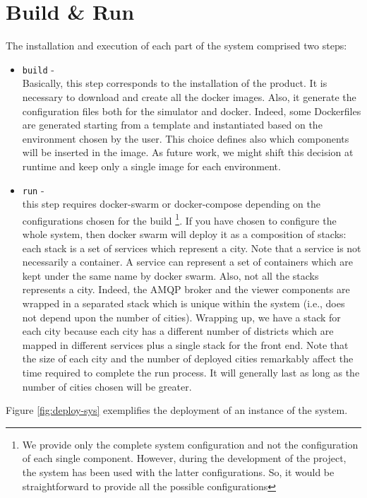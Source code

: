 \section{Build \& Run}
The installation and execution of each part of the system comprised two steps:

\begin{itemize}
   \item \texttt{build} -
   \\
   Basically, this step corresponds to the installation of the product.
   It is necessary to download and create all the docker
   images. Also, it generate the configuration files both for the simulator and
   docker. Indeed, some Dockerfiles are generated starting from a template and
   instantiated based on the environment chosen by the user. This choice defines
   also which components will be inserted in the image. As future work,
   we might shift this decision at runtime and keep only a single image for each
   environment.
   \item \texttt{run} -
   \\
   this step requires docker-swarm
	or docker-compose depending on the configurations chosen for the build
	\footnote{We provide only the complete system configuration and not the
	configuration of each single component.
   However, during the development of the project,
	the system has been used with the latter configurations.
	So, it would be straightforward to provide all the possible configurations}.
	If you have chosen to configure the whole system, then docker swarm
   will deploy it as a composition of stacks:
   each stack is a set of services which represent
   a city. Note that a service is not necessarily a container.
   A service can represent a set of containers which are kept under the same
   name by docker swarm.
   Also, not all the stacks represents a city. Indeed, the AMQP broker
   and the viewer components are wrapped in a separated
   stack which is unique within the system (i.e., does not depend upon the
   number of cities). Wrapping up, we have a stack for each city because
   each city has a different number of districts which are mapped in different
   services plus a single stack for the front end.
   Note that the size of each city and the number of deployed
   cities remarkably affect the time required to complete the run process.
	It will generally last as long as the number of cities chosen will be greater.
\end{itemize}

Figure \ref{fig:deploy-sys} exemplifies the deployment of an instance of the
system.

